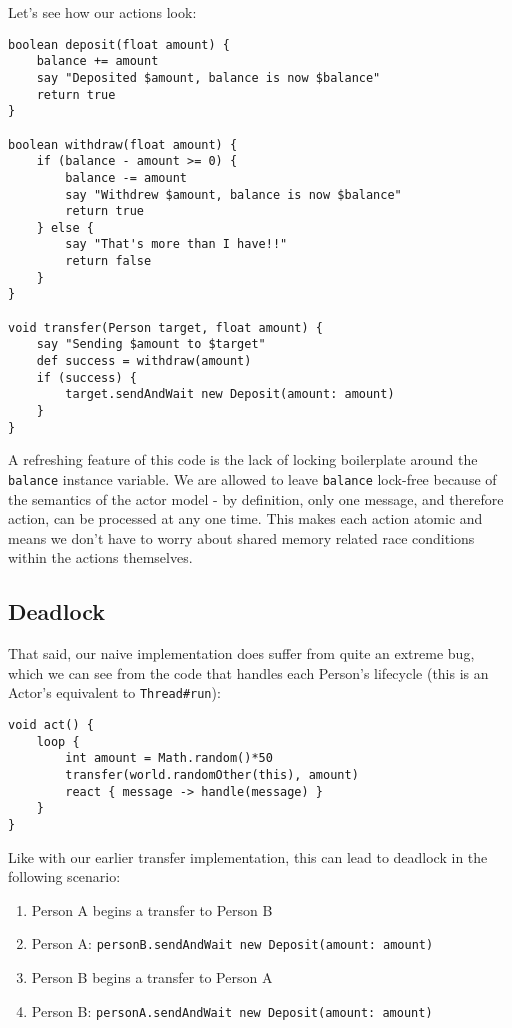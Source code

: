 \documentclass[a4paper,12pt]{kth-mag}
\begin{document}
Let's see how our actions look:

\begin{listing}[H]
	\begin{verbatim}
boolean deposit(float amount) {
    balance += amount
    say "Deposited $amount, balance is now $balance"
    return true
}

boolean withdraw(float amount) {
    if (balance - amount >= 0) {
        balance -= amount
        say "Withdrew $amount, balance is now $balance"
        return true
    } else {
        say "That's more than I have!!"
        return false
    }
}

void transfer(Person target, float amount) {
    say "Sending $amount to $target"
    def success = withdraw(amount)
    if (success) { 
        target.sendAndWait new Deposit(amount: amount)
    } 
}
	\end{verbatim}
\end{listing}

A refreshing feature of this code is the lack of locking boilerplate around the \texttt{balance} instance variable. We are allowed to leave \texttt{balance} lock-free because of the semantics of the actor model - by definition, only one message, and therefore action, can be processed at any one time. This makes each action atomic and means we don't have to worry about shared memory related race conditions within the actions themselves.

\subsection{Deadlock}

That said, our naive implementation does suffer from quite an extreme bug, which we can see from the code that handles each Person's lifecycle (this is an Actor's equivalent to \texttt{Thread\#run}):

\begin{listing}[H]
	\begin{verbatim}
void act() {
    loop {
        int amount = Math.random()*50
        transfer(world.randomOther(this), amount)
        react { message -> handle(message) }
    }
}
	\end{verbatim}
\end{listing}

Like with our earlier transfer implementation, this can lead to deadlock in the following scenario:

\begin{enumerate}
\item Person A begins a transfer to Person B
\item Person A: \texttt{personB.sendAndWait new Deposit(amount: amount)}
\item Person B begins a transfer to Person A
\item Person B: \texttt{personA.sendAndWait new Deposit(amount: amount)}
\end{enumerate}
\end{document}
